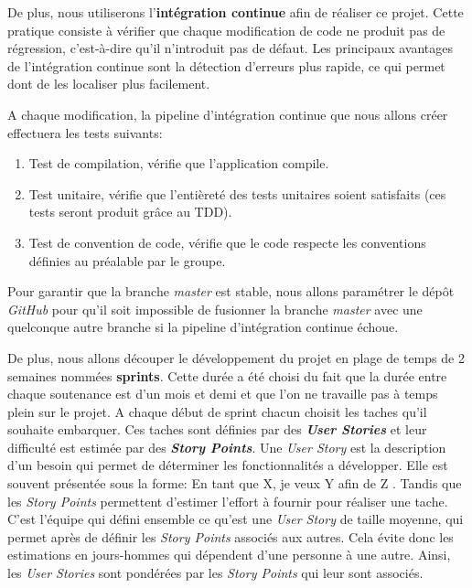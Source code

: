 \documentclass[11pt, a4paper]{specifications}
\begin{document}
De plus, nous utiliserons l'\textbf{intégration continue} afin de réaliser ce projet. Cette pratique consiste à vérifier que chaque modification de code ne produit pas de régression, c'est-à-dire qu'il n'introduit pas de défaut. Les principaux avantages de l'intégration continue sont la détection d'erreurs plus rapide, ce qui permet dont de les localiser plus facilement.

A chaque modification, la pipeline d'intégration continue que nous allons créer effectuera les tests suivants:
\begin{enumerate}
    \item Test de compilation, vérifie que l'application compile.
    \item Test unitaire, vérifie que l'entièreté des tests unitaires soient satisfaits (ces tests seront produit grâce au TDD).
    \item Test de convention de code, vérifie que le code respecte les conventions définies au préalable par le groupe.
\end{enumerate}
\bigbreak

Pour garantir que la branche \textit{master} est stable, nous allons paramétrer le dépôt \textit{GitHub} pour qu'il soit impossible de fusionner la branche \textit{master} avec une quelconque autre branche si la pipeline d'intégration continue échoue. \clearpage

De plus, nous allons découper le développement du projet en plage de temps de 2 semaines nommées \textbf{sprints}. Cette durée a été choisi du fait que la durée entre chaque soutenance est d'un mois et demi et que l'on ne travaille pas à temps plein sur le projet. A chaque début de sprint chacun choisit les taches qu'il souhaite embarquer. Ces taches sont définies par des \textbf{\textit{User Stories}} et leur difficulté est estimée par des \textbf{\textit{Story Points}}. Une \textit{User Story} est la description d'un besoin qui permet de déterminer les fonctionnalités a développer. Elle est souvent présentée sous la forme: \og En tant que X, je veux Y afin de Z \fg. Tandis que les \textit{Story Points} permettent d'estimer l'effort à fournir pour réaliser une tache. C'est l'équipe qui défini ensemble ce qu'est une \textit{User Story} de taille moyenne, qui permet après de définir les \textit{Story Points} associés aux autres. Cela évite donc les estimations en jours-hommes qui dépendent d'une personne à une autre. Ainsi, les \textit{User Stories} sont pondérées par les \textit{Story Points} qui leur sont associés.\\
\end{document}
